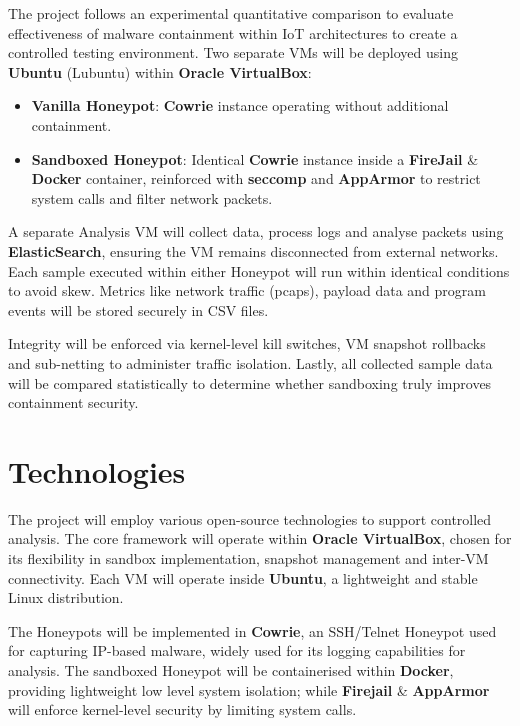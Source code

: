 \documentclass[a4paper,12pt,oneside]{book}			%
\begin{document}
The project follows an experimental quantitative comparison to evaluate effectiveness of malware containment within IoT architectures to create a controlled testing environment. Two separate VMs will be deployed using \textbf{Ubuntu} (Lubuntu) within \textbf{Oracle VirtualBox}:
\begin{itemize}
\item\textbf{Vanilla Honeypot}: \textbf{Cowrie} instance operating without additional containment.
\item\textbf{Sandboxed Honeypot}: Identical \textbf{Cowrie} instance inside a \textbf{FireJail} \& \textbf{Docker} container, reinforced with \textbf{seccomp} and \textbf{AppArmor} to restrict system calls and filter network packets.
\end{itemize}

A separate Analysis VM will collect data, process logs and analyse packets using \textbf{ElasticSearch}, ensuring the VM remains disconnected from external networks. Each sample executed within either Honeypot will run within identical conditions to avoid skew. Metrics like network traffic (pcaps), payload data and program events will be stored securely in CSV files.

Integrity will be enforced via kernel-level kill switches, VM snapshot rollbacks and sub-netting to administer traffic isolation. Lastly, all collected sample data will be compared statistically to determine whether sandboxing truly improves containment security. 


\section{Technologies}\label{sec:technologies}

The project will employ various open-source technologies to support controlled analysis. The core framework will operate within \textbf{Oracle VirtualBox}, chosen for its flexibility in sandbox implementation, snapshot management and inter-VM connectivity. Each VM will operate inside \textbf{Ubuntu}, a lightweight and stable Linux distribution.

The Honeypots will be implemented in \textbf{Cowrie}, an SSH/Telnet Honeypot used for capturing IP-based malware, widely used for its logging capabilities for analysis. The sandboxed Honeypot will be containerised within \textbf{Docker}, providing lightweight low level system isolation; while \textbf{Firejail} \& \textbf{AppArmor}  will enforce kernel-level security by limiting system calls.
\end{document}
